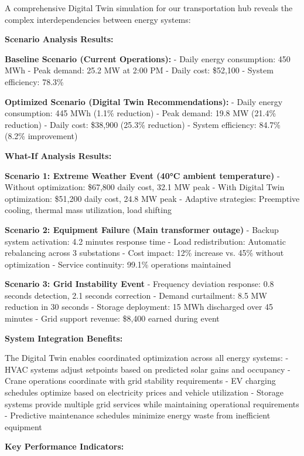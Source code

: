 \documentclass{article}
\begin{document}
A comprehensive Digital Twin simulation for our transportation hub reveals the complex interdependencies between energy systems:

\textbf{Scenario Analysis Results:}

\textbf{Baseline Scenario (Current Operations):}
- Daily energy consumption: 450 MWh
- Peak demand: 25.2 MW at 2:00 PM
- Daily cost: \$52,100
- System efficiency: 78.3\%

\textbf{Optimized Scenario (Digital Twin Recommendations):}
- Daily energy consumption: 445 MWh (1.1\% reduction)
- Peak demand: 19.8 MW (21.4\% reduction)
- Daily cost: \$38,900 (25.3\% reduction)
- System efficiency: 84.7\% (8.2\% improvement)

\textbf{What-If Analysis Results:}

\textbf{Scenario 1: Extreme Weather Event (40°C ambient temperature)}
- Without optimization: \$67,800 daily cost, 32.1 MW peak
- With Digital Twin optimization: \$51,200 daily cost, 24.8 MW peak
- Adaptive strategies: Preemptive cooling, thermal mass utilization, load shifting

\textbf{Scenario 2: Equipment Failure (Main transformer outage)}
- Backup system activation: 4.2 minutes response time
- Load redistribution: Automatic rebalancing across 3 substations
- Cost impact: 12\% increase vs. 45\% without optimization
- Service continuity: 99.1\% operations maintained

\textbf{Scenario 3: Grid Instability Event}
- Frequency deviation response: 0.8 seconds detection, 2.1 seconds correction
- Demand curtailment: 8.5 MW reduction in 30 seconds
- Storage deployment: 15 MWh discharged over 45 minutes
- Grid support revenue: \$8,400 earned during event

\textbf{System Integration Benefits:}

The Digital Twin enables coordinated optimization across all energy systems:
- HVAC systems adjust setpoints based on predicted solar gains and occupancy
- Crane operations coordinate with grid stability requirements
- EV charging schedules optimize based on electricity prices and vehicle utilization
- Storage systems provide multiple grid services while maintaining operational requirements
- Predictive maintenance schedules minimize energy waste from inefficient equipment

\textbf{Key Performance Indicators:}
\end{document}
